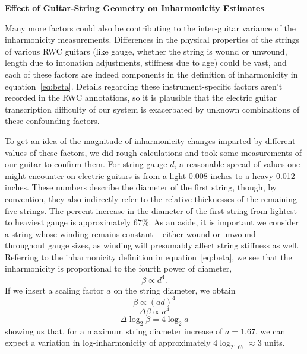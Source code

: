 \documentclass[12pt]{cmuthesis}
\begin{document}
\textbf{Effect of Guitar-String Geometry on Inharmonicity Estimates}

Many more factors could also be contributing to the inter-guitar variance of the inharmonicity measurements. Differences in the physical properties of the strings of various RWC guitars (like gauge, whether the string is wound or unwound, length due to intonation adjustments, stiffness due to age) could be vast, and each of these factors are indeed components in the definition of inharmonicity in equation~\eqref{eq:beta}. Details regarding these instrument-specific factors aren't recorded in the RWC annotations, so it is plausible that the electric guitar transcription difficulty of our system is exacerbated by unknown combinations of these confounding factors. 

To get an idea of the magnitude of inharmonicity changes imparted by different values of these factors, we did rough calculations and took some measurements of our guitar to confirm them. For string gauge $d$, a reasonable spread of values one might encounter on electric guitars is from a light 0.008 inches to a heavy 0.012 inches. These numbers describe the diameter of the first string, though, by convention, they also indirectly refer to the relative thicknesses of the remaining five strings. The percent increase in the diameter of the first string from lightest to heaviest gauge is approximately $67\%$. As an aside, it is important we consider a string whose winding remains constant -- either wound or unwound -- throughout gauge sizes, as winding will presumably affect string stiffness as well. Referring to the inharmonicity definition in equation~\eqref{eq:beta}, we see that the inharmonicity is proportional to the fourth power of diameter,
\begin{equation}
\beta \propto d^4.
\end{equation}
If we insert a scaling factor $a$ on the string diameter, we obtain
\begin{equation}
\beta \propto(ad)^4
\end{equation}
\begin{equation}
\Delta\beta \propto a^4
\end{equation}
\begin{equation}
\Delta\log_2\beta = 4\log_2a
\end{equation}
showing us that, for a maximum string diameter increase of $a=1.67$, we can expect a variation in log-inharmonicity of approximately $4\log_21.67 \approx 3$ units.
\end{document}
